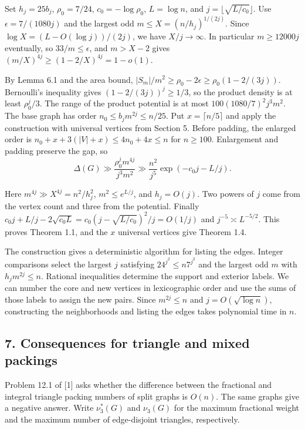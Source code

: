 \documentclass[english,11pt,a4paper]{article}
\begin{document}
Set \(h_j=25b_j\), \(\rho_0=7/24\), \(c_0=-\log\rho_0\), \(L=\log n\), and \(j=\lfloor\sqrt{L/c_0}\rfloor\). Use \(\epsilon=7/(1080j)\) and the largest odd \(m\le X=(n/h_j)^{1/(2j)}\). Since \(\log X=(L-O(\log j))/(2j)\), we have \(X/j\to\infty\). In particular \(m\ge12000j\) eventually, so \(33/m\le\epsilon\), and \(m>X-2\) gives \((m/X)^{4j}\ge(1-2/X)^{4j}=1-o(1)\).

By Lemma 6.1 and the area bound, \(|S_m|/m^2\ge\rho_0-2\epsilon\ge\rho_0(1-2/(3j))\). Bernoulli's inequality gives \((1-2/(3j))^j\ge1/3\), so the product density is at least \(\rho_0^j/3\). The range of the product potential is at most \(100(1080/7)^2j^3m^2\). The base graph has order \(n_0\le b_jm^{2j}\le n/25\). Put \(x=\lceil n/5\rceil\) and apply the construction with universal vertices from Section 5. Before padding, the enlarged order is \(n_0+x+3(|V|+x)\le4n_0+4x\le n\) for \(n\ge100\). Enlargement and padding preserve the gap, so
\[\Delta(G)\gg\frac{\rho_0^j m^{4j}}{j^3m^2}
 \gg\frac{n^2}{j^5}\exp(-c_0j-L/j).\]

Here \(m^{4j}\gg X^{4j}=n^2/h_j^2\), \(m^2\le e^{L/j}\), and \(h_j=O(j)\). Two powers of \(j\) come from the vertex count and three from the potential. Finally \(c_0j+L/j-2\sqrt{c_0L}=c_0(j-\sqrt{L/c_0})^2/j=O(1/j)\) and \(j^{-5}\asymp L^{-5/2}\). This proves Theorem 1.1, and the \(x\) universal vertices give Theorem 1.4.

The construction gives a deterministic algorithm for listing the edges. Integer comparisons select the largest \(j\) satisfying \(24^{j^2}\le n7^{j^2}\) and the largest odd \(m\) with \(h_jm^{2j}\le n\). Rational inequalities determine the support and exterior labels. We can number the core and new vertices in lexicographic order and use the sums of those labels to assign the new pairs. Since \(m^{2j}\le n\) and \(j=O(\sqrt{\log n})\), constructing the neighborhoods and listing the edges takes polynomial time in \(n\).

\subsection{7. Consequences for triangle and mixed packings}\label{consequences-for-triangle-and-mixed-packings}

Problem 12.1 of {[}1{]} asks whether the difference between the fractional and integral triangle packing numbers of split graphs is \(O(n)\). The same graphs give a negative answer. Write \(\nu_3^*(G)\) and \(\nu_3(G)\) for the maximum fractional weight and the maximum number of edge-disjoint triangles, respectively.
\end{document}
